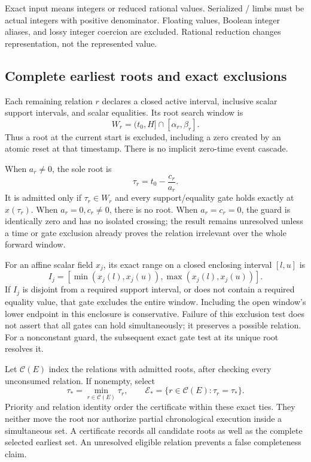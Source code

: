 Exact input means integers or reduced rational values. Serialized
/ limbs must be actual integers with positive
denominator. Floating values, Boolean integer aliases, and lossy
integer coercion are excluded. Rational reduction changes representation,
not the represented value.

\subsection{Complete earliest roots and exact exclusions}

Each remaining relation $r$ declares a closed active interval,
inclusive scalar support intervals, and scalar equalities. Its root
search window is
\begin{equation}
 W_r=(t_0,H]\cap[\alpha_r,\beta_r].
 \label{eq:r16-event-window}
\end{equation}
Thus a root at the current start is excluded, including a zero created
by an atomic reset at that timestamp. There is no implicit zero-time
event cascade.

When $a_r\ne0$, the sole root is
\begin{equation}
 \tau_r=t_0-\frac{c_r}{a_r}.
 \label{eq:r16-affine-root}
\end{equation}
It is admitted only if $\tau_r\in W_r$ and every support/equality gate
holds exactly at $x(\tau_r)$. When $a_r=0,c_r\ne0$, there is no root.
When $a_r=c_r=0$, the guard is identically zero and has no isolated
crossing; the result remains unresolved unless a time or gate exclusion
already proves the relation irrelevant over the whole forward window.

For an affine scalar field $x_j$, its exact range on a closed enclosing
interval $[l,u]$ is
\begin{equation}
 I_j=[\min(x_j(l),x_j(u)),\max(x_j(l),x_j(u))].
 \label{eq:r16-affine-enclosure}
\end{equation}
If $I_j$ is disjoint from a required support interval, or does not contain
a required equality value, that gate excludes the entire window. Including
the open window's lower endpoint in this enclosure is conservative.
Failure of this exclusion test does not assert that all gates can hold
simultaneously; it preserves a possible relation. For a nonconstant
guard, the subsequent exact gate test at its unique root resolves it.

Let $\mathcal C(E)$ index the relations with admitted roots, after
checking every unconsumed relation. If nonempty, select
\begin{equation}
 \tau_* = \min_{r\in\mathcal C(E)}\tau_r,\qquad
 \mathcal E_* =\{r\in\mathcal C(E):\tau_r=\tau_*\}.
 \label{eq:r16-earliest-set}
\end{equation}
Priority and relation identity order the certificate within these exact
ties. They neither move the root nor authorize partial chronological
execution inside a simultaneous set. A certificate records all candidate
roots as well as the complete selected earliest set. An unresolved
eligible relation prevents a false completeness claim.


